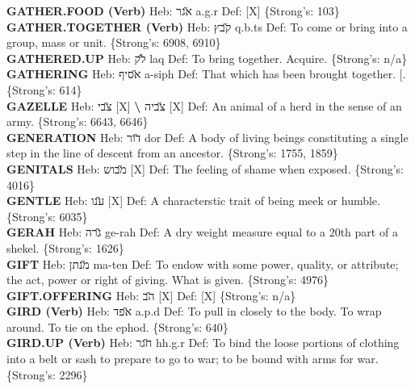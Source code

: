 {\textbf{GATHER.FOOD (Verb)} Heb: {\large\H אגר} a.g.r Def: {[}X{]} \{Strong's: 103\}\hfill{}\\

\textbf{GATHER.TOGETHER (Verb)} Heb: {\large\H קבץ} q.b.ts Def: To come or bring into a group, mass or unit. \{Strong's: 6908, 6910\}\hfill{}\\

\textbf{GATHERED.UP} Heb: {\large\H לק} laq Def: To bring together. Acquire. \{Strong's: n/a\}\hfill{}\\

\textbf{GATHERING} Heb: {\large\H אסיף} a-siph Def: That which has been brought together. {[}. \{Strong's: 614\}\hfill{}\\

\textbf{GAZELLE} Heb: {\large\H צבי} {[}X{]} \textbf{\textbackslash{}} {\large\H צביה} {[}X{]} Def: An animal of a herd in the sense of an army. \{Strong's: 6643, 6646\}\hfill{}\\

\textbf{GENERATION} Heb: {\large\H דור} dor Def: A body of living beings constituting a single step in the line of descent from an ancestor. \{Strong's: 1755, 1859\}\hfill{}\\

\textbf{GENITALS} Heb: {\large\H מבוש} {[}X{]} Def: The feeling of shame when exposed. \{Strong's: 4016\}\hfill{}\\

\textbf{GENTLE} Heb: {\large\H ענו} {[}X{]} Def: A characterstic trait of being meek or humble. \{Strong's: 6035\}\hfill{}\\

\textbf{GERAH} Heb: {\large\H גרה} ge-rah Def: A dry weight measure equal to a 20th part of a shekel. \{Strong's: 1626\}\hfill{}\\

\textbf{GIFT} Heb: {\large\H מנתן} ma-ten Def: To endow with some power, quality, or attribute; the act, power or right of giving. What is given. \{Strong's: 4976\}\hfill{}\\

\textbf{GIFT.OFFERING} Heb: {\large\H הב} {[}X{]} Def: {[}X{]} \{Strong's: n/a\}\hfill{}\\

\textbf{GIRD (Verb)} Heb: {\large\H אפד} a.p.d Def: To pull in closely to the body. To wrap around. To tie on the ephod. \{Strong's: 640\}\hfill{}\\

\textbf{GIRD.UP (Verb)} Heb: {\large\H חגר} hh.g.r Def: To bind the loose portions of clothing into a belt or sash to prepare to go to war; to be bound with arms for war. \{Strong's: 2296\}\hfill{}\\

}
